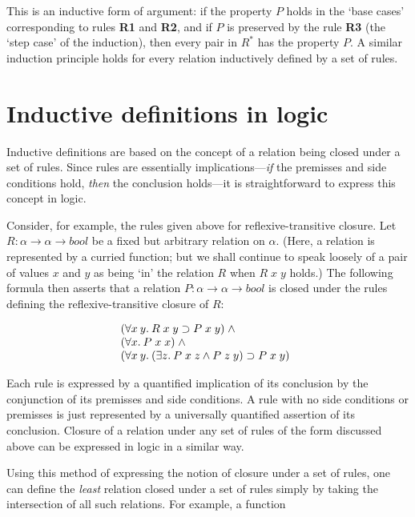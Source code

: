 \noindent This is an inductive form of argument: if the property $P$ holds in
the `base cases' corresponding to rules {{\small\bf R}\bf 1} and {{\small\bf
R}\bf 2}, and if $P$ is preserved by the rule {{\small\bf R}\bf 3} (the `step
case' of the induction), then every pair in $R^{*}$ has the property $P$.  A
similar induction principle holds for every relation inductively defined by a
set of rules.

\section{Inductive definitions in logic}\label{in-logic}


Inductive definitions are based on the concept of a relation being closed under
a set of rules.  Since rules are essentially implications---{\it if\/} the
premisses and side conditions hold, {\it then\/} the conclusion holds---it is
straightforward to express this concept in logic.

Consider, for example, the rules given above for reflexive-transitive closure.
Let $R : \alpha{\rightarrow}\alpha{\rightarrow}bool$ be a fixed but arbitrary
 relation on $\alpha$. (Here, a relation is represented by a curried function;
but we shall continue to speak loosely of a pair of values $x$ and $y$ as being
`in' the relation $R$ when $R\;x\;y$ holds.)  The following formula then
asserts that a relation $P : \alpha{\rightarrow}\alpha{\rightarrow}bool$ is
closed under the rules defining the reflexive-transitive closure of $R$:

\smallskip
\[\begin{array}[t]{@{}l}
 (\forall x\:y.\:R\;x\;y \supset P\;x\;y)\; \wedge \\
 (\forall x.\:P\;x\;x)\; \wedge \\
 (\forall x\:y.\:(\exists z.\:P\;x\;z \wedge P\;z\;y) \supset P\;x\;y) 
\end{array}\]
\smallskip

\noindent Each rule is expressed by a quantified implication of its conclusion
by the conjunction of its premisses and side conditions.  A rule with no side
conditions or premisses is just represented by a universally quantified
assertion of its conclusion. Closure of a relation under any set of rules of
the form discussed above can be expressed in logic in a similar way.

Using this method of expressing the notion of \mbox{closure} under a set of
rules, one can define the {\it least\/} relation closed under a set of rules
simply by taking the intersection of all such relations.  For example, a
function

